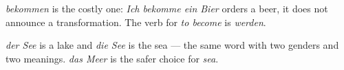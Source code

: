 \begin{gnote}
\textit{bekommen} is the costly one: \textit{Ich bekomme ein Bier} orders a
beer, it does not announce a transformation. The verb for \emph{to become} is
\textit{werden}.
\end{gnote}

\begin{gnote}
\textit{der See} is a lake and \textit{die See} is the sea — the same word with
two genders and two meanings. \textit{das Meer} is the safer choice for
\emph{sea}.
\end{gnote}
